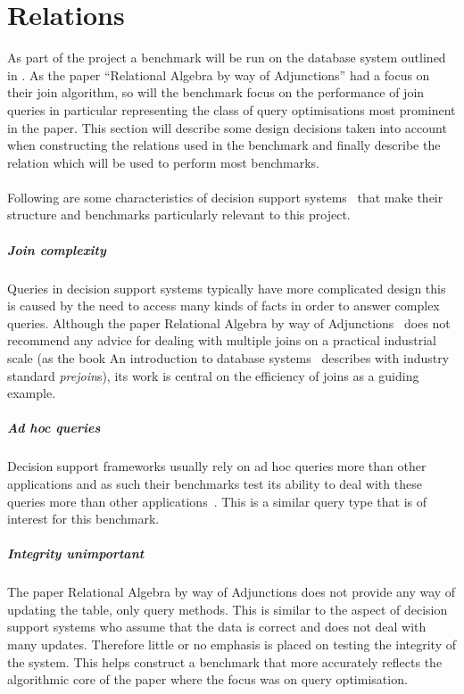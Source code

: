 \section{Relations}
As part of the project a benchmark will be run on the database system outlined
in . As the paper ``Relational Algebra by way of
Adjunctions'' had a focus on their join algorithm, so will the benchmark focus
on the performance of join queries in particular representing the class of query
optimisations most prominent in the paper. This section will describe some design
decisions taken into account when constructing the relations used in the
benchmark and finally describe the  relation which will be
used to perform most benchmarks.

\paragraph{}Following are some characteristics of decision support
systems~\cite{IntroToDatabaseSystems}
that make their structure and benchmarks particularly relevant to this
project.

\subparagraph{Join complexity} Queries in decision support systems typically
have more complicated design this is caused by the need to access many
kinds of facts in order to answer complex queries. Although the
paper Relational Algebra by way of Adjunctions~\cite{RelationalAlgebraByWayOfAdjunctions}
does not recommend any advice for dealing with multiple joins on a practical
industrial scale (as the book An introduction to database
systems~\cite{IntroToDatabaseSystems} describes with industry
standard \emph{prejoin}s), its work is central on the efficiency of joins as a
guiding example.

\subparagraph{Ad hoc queries} Decision support frameworks usually rely on ad hoc
queries more than other applications and as such their benchmarks test its
ability to deal with these queries more than other applications~\cite{SetQueryBenchmark, PractitionersIntroduction}. This is a similar
query type that is of interest for this benchmark.

\subparagraph{Integrity unimportant} The paper Relational Algebra by way of
Adjunctions does not provide any way of
updating the table, only query methods. This is similar to the aspect of
decision support systems who assume that the data is correct and
does not deal with many updates. Therefore little or no emphasis is placed on
testing the integrity of the system. This helps construct a benchmark that more
accurately reflects the algorithmic core of the paper where the focus was on
query optimisation.
